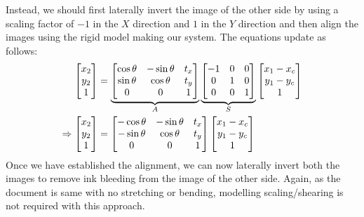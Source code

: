 \documentclass[a4paper]{article}
\begin{document}
\begin{enumerate}[label=(\alph*)]
	Instead, we should first laterally invert the image of the other side by using a scaling factor of $-1$ in the $X$ direction and $1$ in the $Y$ direction and then align the images using the rigid model making our system. The equations update as follows:
	\begin{align}{\label{eq:rigidunequalscaling}}
		\begin{bmatrix}
			x_2\\y_2\\1
		\end{bmatrix}
		&=
		\underbrace{
		\begin{bmatrix}
			\cos\theta & -\sin\theta & t_x\\
			\sin\theta & \cos\theta  & t_y\\
			0          & 0           & 1\\
		\end{bmatrix}
		}_{A}
		\underbrace{
		\begin{bmatrix}
			-1 & 0 & 0\\
			 0 & 1 & 0\\
			 0 & 0 & 1\\
		\end{bmatrix}
		}_{S}
		\begin{bmatrix}
			x_1-x_c\\y_1 - y_c\\1
		\end{bmatrix}
		\\
		\Rightarrow
		\begin{bmatrix}
			x_2\\y_2\\1
		\end{bmatrix}
		&=
		\begin{bmatrix}
			-\cos\theta & -\sin\theta & t_x\\
			-\sin\theta & \cos\theta  & t_y\\
			0           & 0           & 1\\
		\end{bmatrix}
		\begin{bmatrix}
			x_1-x_c\\y_1 - y_c\\1
		\end{bmatrix}
	\end{align}
	Once we have established the alignment, we can now laterally invert both the images to remove ink bleeding from the image of the other side. Again, as the document is same with no stretching or bending, modelling scaling/shearing is not required with this approach.


\end{enumerate}
\end{document}

